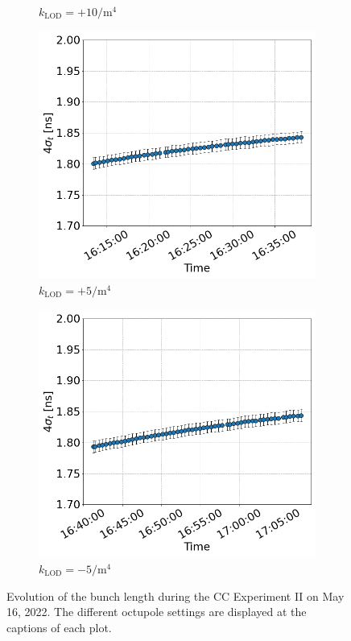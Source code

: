 \begin{figure}[htp]
\begin{subfigure}{.45\textwidth}
         \caption{$k_\mathrm{LOD}=+10  \mathrm{/m^{4}}$}
     \end{subfigure}
     \begin{subfigure}{.45\textwidth}
         \centering
         \includegraphics[width=.95\linewidth]{images/app_c/bunch_length_COAST_08.png}  
         \caption{$k_\mathrm{LOD}=+5  \mathrm{/m^{4}}$}
     \end{subfigure}
     \begin{subfigure}{.45\textwidth}
             \centering
             \includegraphics[width=.95\linewidth]{images/app_c/bunch_length_COAST_09.png}  
             \caption{$k_\mathrm{LOD}=-5 \mathrm{/m^{4}}$}
     \end{subfigure}
     \caption{Evolution of the bunch length during the  CC Experiment II on May 16, 2022. The different octupole settings are displayed at the captions of each plot.}
     \label{fig:cc_md_2022_overview_plots_klod_scan_bunch_length}
  \end{figure}
 
